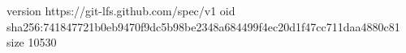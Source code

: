 version https://git-lfs.github.com/spec/v1
oid sha256:741847721b0eb9470f9dc5b98be2348a684499f4ec20d1f47cc711daa4880c81
size 10530
